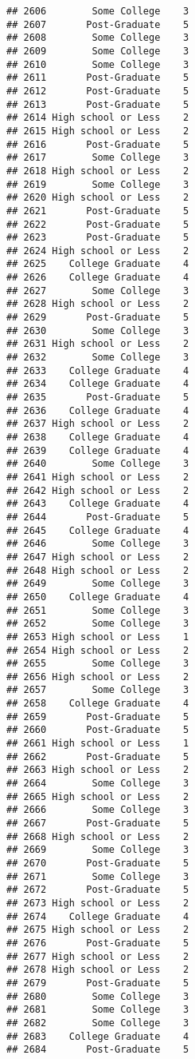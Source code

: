 \documentclass[
]{article}
\begin{document}
\begin{verbatim}
## 2606        Some College    3
## 2607       Post-Graduate    5
## 2608        Some College    3
## 2609        Some College    3
## 2610        Some College    3
## 2611       Post-Graduate    5
## 2612       Post-Graduate    5
## 2613       Post-Graduate    5
## 2614 High school or Less    2
## 2615 High school or Less    2
## 2616       Post-Graduate    5
## 2617        Some College    3
## 2618 High school or Less    2
## 2619        Some College    3
## 2620 High school or Less    2
## 2621       Post-Graduate    5
## 2622       Post-Graduate    5
## 2623       Post-Graduate    5
## 2624 High school or Less    2
## 2625    College Graduate    4
## 2626    College Graduate    4
## 2627        Some College    3
## 2628 High school or Less    2
## 2629       Post-Graduate    5
## 2630        Some College    3
## 2631 High school or Less    2
## 2632        Some College    3
## 2633    College Graduate    4
## 2634    College Graduate    4
## 2635       Post-Graduate    5
## 2636    College Graduate    4
## 2637 High school or Less    2
## 2638    College Graduate    4
## 2639    College Graduate    4
## 2640        Some College    3
## 2641 High school or Less    2
## 2642 High school or Less    2
## 2643    College Graduate    4
## 2644       Post-Graduate    5
## 2645    College Graduate    4
## 2646        Some College    3
## 2647 High school or Less    2
## 2648 High school or Less    2
## 2649        Some College    3
## 2650    College Graduate    4
## 2651        Some College    3
## 2652        Some College    3
## 2653 High school or Less    1
## 2654 High school or Less    2
## 2655        Some College    3
## 2656 High school or Less    2
## 2657        Some College    3
## 2658    College Graduate    4
## 2659       Post-Graduate    5
## 2660       Post-Graduate    5
## 2661 High school or Less    1
## 2662       Post-Graduate    5
## 2663 High school or Less    2
## 2664        Some College    3
## 2665 High school or Less    2
## 2666        Some College    3
## 2667       Post-Graduate    5
## 2668 High school or Less    2
## 2669        Some College    3
## 2670       Post-Graduate    5
## 2671        Some College    3
## 2672       Post-Graduate    5
## 2673 High school or Less    2
## 2674    College Graduate    4
## 2675 High school or Less    2
## 2676       Post-Graduate    5
## 2677 High school or Less    2
## 2678 High school or Less    2
## 2679       Post-Graduate    5
## 2680        Some College    3
## 2681        Some College    3
## 2682        Some College    3
## 2683    College Graduate    4
## 2684       Post-Graduate    5

\end{verbatim}
\end{document}
